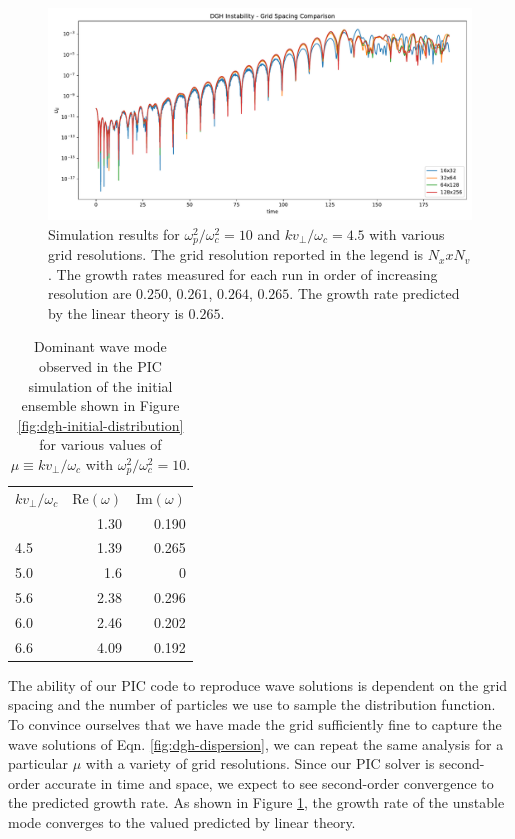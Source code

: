 \documentclass[%
 reprint,
 amsmath,amssymb,
 aps,
]{revtex4-2}
\begin{document}
\begin{figure}[b]
\includegraphics[width=0.9\linewidth]{proj4/dgh_grid_spacing_comparison.pdf}
\caption{\label{fig:dgh-grid-spacing-comparison}Simulation results for $\omega_p^2 / \omega_c ^2 = 10$ and $k v_\perp / \omega_c = 4.5$ with various grid resolutions. The grid resolution reported in the legend is $N_x x N_v$. The growth rates measured for each run in order of increasing resolution are $0.250$, $0.261$, $0.264$, $0.265$. The growth rate predicted by the linear theory is $0.265$.}
\end{figure}

\begin{table}[b]
\caption{\label{tab:frequency-values}Dominant wave mode observed in the PIC simulation of the initial ensemble shown in Figure \ref{fig:dgh-initial-distribution} for various values of $\mu \equiv k v_\perp / \omega_c$ with $\omega_p ^2 / \omega_c ^2 = 10$.}
\begin{ruledtabular}
\begin{tabular}{lrr}
$k v_\perp / \omega_c$&
$\text{Re}(\omega)$&
$\text{Im}(\omega)$\\
\colrule
4.1 & 1.30 & 0.190\\
4.5 & 1.39 & 0.265\\
5.0 & 1.6 & 0\\
5.6 & 2.38 & 0.296\\
6.0 & 2.46 & 0.202\\
6.6 & 4.09 & 0.192\\
\end{tabular}
\end{ruledtabular}
\end{table}

The ability of our PIC code to reproduce wave solutions is dependent on the grid spacing and the number of particles we use to sample the distribution function. To convince ourselves that we have made the grid sufficiently fine to capture the wave solutions of Eqn. \ref{fig:dgh-dispersion}, we can repeat the same analysis for a particular $\mu$ with a variety of grid resolutions. Since our PIC solver is second-order accurate in time and space, we expect to see second-order convergence to the predicted growth rate. As shown in Figure \ref{fig:dgh-grid-spacing-comparison}, the growth rate of the unstable mode converges to the valued predicted by linear theory.
\end{document}
